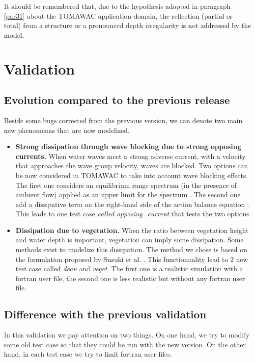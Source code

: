 It should be remembered that, due to the hypothesis adopted in paragraph \ref{par31} about the TOMAWAC application domain, the reflection (partial or total) from a structure or a pronounced depth irregularity is not addressed by the model.

\section{Validation}
%
\subsection{Evolution compared to the previous release}
Beside some bugs corrected from the previous version, we can denote two main new phenomenas that are now modelized. 
\begin{itemize}
\item {\bf Strong dissipation through wave blocking due to strong opposing currents.} When water waves meet a strong adverse current, with a velocity that approaches the wave group velocity, waves are blocked. Two options can be now considered in TOMAWAC to take into account wave blocking effects. The first one considers an equilibrium range spectrum (in the presence of ambient flow) applied as an upper limit for the spectrum  \cite{hedges}. The second one add a dissipative term on the right-hand side of the action balance equation \cite{Westhuysen_2012}. This leads to one test case {\it called opposing\_current} that tests the two options.  
\item {\bf Dissipation due to vegetation.} When the ratio between vegetation height and water depth is important, vegetation can imply some dissipation. Some methods exist  to modelize this dissipation. The method we chose is based on the formulation proposed by Suzuki et al. \cite{suzuki}. This functionnality lead to 2 new test case called {\it dean } and {\it veget}. The first one is a realistic simulation with a fortran user file, the second one is less realistic but without any fortran user file. 
\end {itemize} 
\subsection{Difference with the previous validation}
In this validation we pay attention on two things. On one hand, we try to modify some old test case so that they could be run with the new version. On the other hand, in each test case we try to limit fortran user files. 

